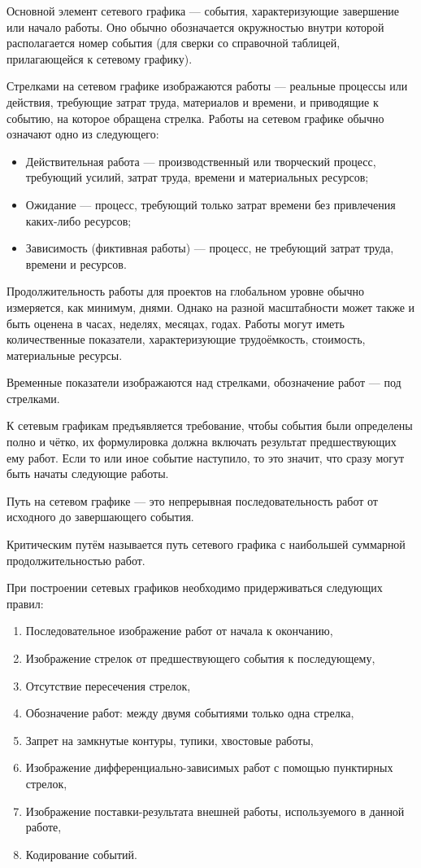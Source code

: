 Основной элемент сетевого графика --- события, характеризующие завершение или начало работы. Оно обычно обозначается окружностью внутри которой располагается номер события (для сверки со справочной таблицей, прилагающейся к сетевому графику).

Стрелками на сетевом графике изображаются работы --- реальные процессы или действия, требующие затрат труда, материалов и времени, и приводящие к событию, на которое обращена стрелка. Работы на сетевом графике обычно означают одно из следующего:
\begin{itemize}
	\item Действительная работа --- производственный или творческий процесс, требующий усилий, затрат труда, времени и материальных ресурсов;
	\item Ожидание --- процесс, требующий только затрат времени без привлечения каких-либо ресурсов;
	\item Зависимость (фиктивная работы) --- процесс, не требующий затрат труда, времени и ресурсов.
\end{itemize}

Продолжительность работы для проектов на глобальном уровне обычно измеряется, как минимум, днями. Однако на разной масштабности может также и быть оценена в часах, неделях, месяцах, годах. Работы могут иметь количественные показатели, характеризующие трудоёмкость, стоимость, материальные ресурсы.

Временные показатели изображаются над стрелками, обозначение работ --- под стрелками.

К сетевым графикам предъявляется требование, чтобы события были определены полно и чётко, их формулировка должна включать результат предшествующих ему работ. Если то или иное событие наступило, то это значит, что сразу могут быть начаты следующие работы.

Путь на сетевом графике --- это непрерывная последовательность работ от исходного до завершающего события.

Критическим путём называется путь сетевого графика с наибольшей суммарной продолжительностью работ.

При построении сетевых графиков необходимо придерживаться следующих правил:
\begin{enumerate}
	\item Последовательное изображение работ от начала к окончанию,
	\item Изображение стрелок от предшествующего события к последующему,
	\item Отсутствие пересечения стрелок,
	\item Обозначение работ: между двумя событиями только одна стрелка,
	\item Запрет на замкнутые контуры, тупики, хвостовые работы,
	\item Изображение дифференциально-зависимых работ с помощью пунктирных стрелок,
	\item Изображение поставки-результата внешней работы, используемого в данной работе,
	\item Кодирование событий.
\end{enumerate}

